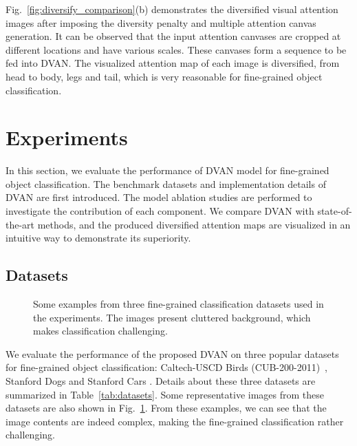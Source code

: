 \documentclass[journal]{IEEEtran}
\begin{document}
Fig.~\ref{fig:diversify_comparison}(b) demonstrates the diversified visual attention images after imposing the diversity penalty and multiple attention canvas generation. It can be observed that the input attention canvases are cropped at different locations and have various scales. These canvases form a sequence to be fed into DVAN. The visualized attention map of each image is diversified, from head to body, legs and tail, which is very reasonable for fine-grained object classification.

\section{Experiments}
\label{sec:experiments}
In this section, we evaluate the performance of DVAN model for fine-grained object classification. The benchmark datasets and implementation details of DVAN are first introduced. The model ablation studies are performed to investigate the contribution of each component. We compare DVAN with state-of-the-art methods, and the produced diversified attention maps are visualized in an intuitive way to demonstrate its superiority.


\subsection{Datasets}
\begin{figure}[!tb]
\centering
{}
\vspace{-0.1in}
\hfil
{}
\vspace{-0.1in}
\hfil
{}
\hfil
\caption{Some examples from three fine-grained classification datasets used in the experiments. The images present cluttered background, which makes classification challenging.}
\label{fig:dogs_cars}
\vspace{-0.2in}
\end{figure}

We evaluate the performance of the proposed DVAN on three popular datasets for fine-grained object classification: Caltech-USCD Birds (CUB-200-2011)~\cite{CUB_200_2011}, Stanford Dogs \cite{standford_dogs} and Stanford Cars \cite{standford_cars}. Details about these three datasets are summarized in Table~\ref{tab:datasets}. Some representative images from these datasets are also shown in Fig.~\ref{fig:dogs_cars}. From these examples, we can see that the image contents are indeed complex, making the fine-grained classification rather challenging.
\end{document}
